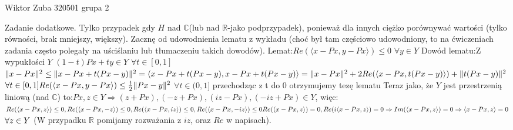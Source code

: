 \documentclass{article}
\begin{document}
Wiktor Zuba 320501 grupa 2
\newline

Zadanie dodatkowe.
\newline
\newline
Tylko przypadek gdy $H$ nad $\mathbb{C}$(lub  nad $\mathbb{R}$-jako podprzypadek), ponieważ dla innych ciężko porównywać wartości (tylko równości, brak mniejszy, większy).\newline
Zacznę od udowodnienia lematu z wykładu (choć był tam częściowo udowodniony, to na ćwiczeniach zadania często polegały na uściślaniu lub tłumaczeniu takich dowodów).\newline
Lemat:$Re(\langle x-Px,y-Px\rangle)\le0$ $\forall y\in Y$\newline
Dowód lematu:Z wypukłości $Y$ $(1-t)Px+ty\in Y$ $\forall t\in[0,1]$\newline
$
\lVert x-Px\rVert^2\le\lVert x-Px+t(Px-y)\rVert^2=\langle x-Px+t(Px-y),x-Px+t(Px-y)\rangle=\newline
\lVert x-Px\rVert^2+2Re(\langle x-Px,t(Px-y)\rangle)+\lVert t(Px-y)\rVert^2$ $\forall t\in [0,1]\newline 
Re(\langle x-Px,y-Px\rangle)\le\frac{t}{2}\lVert Px-y\rVert^2$ $\forall t\in (0,1]$ przechodząc z t do 0 otrzymujemy tezę lematu\newline
Teraz jako, że $Y$ jest przestrzenią liniową (nad $\mathbb{C}$) to:\newline $Px,z\in Y\Rightarrow (z+Px),(-z+Px),(iz-Px),(-iz+Px)\in Y$, więc:\newline
$Re(\langle x-Px,z\rangle)\le 0,Re(\langle x-Px,-z\rangle)\le 0,Re(\langle x-Px,iz\rangle)\le 0,Re(\langle x-Px,-iz\rangle)\le 0\newline
Re(\langle x-Px,z\rangle)=0,Re(i\langle x-Px,z\rangle)=0\Rightarrow Im(\langle x-Px,z\rangle)=0
\Rightarrow \langle x-Px,z\rangle=0$ $\forall z\in Y\newline$
(W przypadku $\mathbb{R}$ pomijamy rozważania z $iz$, oraz $Re$ w napisach).
\end{document}
